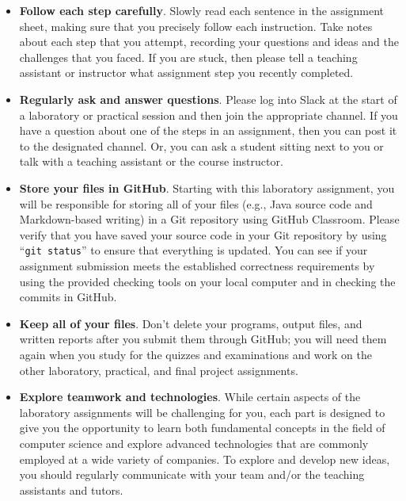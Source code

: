 \documentclass[11pt]{article}
\newcommand{\command}[1]{``\lstinline{#1}''}
\begin{document}
\begin{itemize}
  \setlength{\itemsep}{0pt}

\item {\bf Follow each step carefully}. Slowly read each sentence in the
  assignment sheet, making sure that you precisely follow each instruction. Take
  notes about each step that you attempt, recording your questions and ideas and
  the challenges that you faced. If you are stuck, then please tell a teaching
  assistant or instructor what assignment step you recently completed.

\item {\bf Regularly ask and answer questions}. Please log into Slack at the
  start of a laboratory or practical session and then join the appropriate
  channel. If you have a question about one of the steps in an assignment, then
  you can post it to the designated channel. Or, you can ask a student sitting
  next to you or talk with a teaching assistant or the course instructor.

\item {\bf Store your files in GitHub}. Starting with this laboratory
  assignment, you will be responsible for storing all of your files (e.g., Java
  source code and Markdown-based writing) in a Git repository using GitHub
  Classroom. Please verify that you have saved your source code in your Git
  repository by using \command{git status} to ensure that everything is updated.
  You can see if your assignment submission meets the established correctness
  requirements by using the provided checking tools on your local computer and
  in checking the commits in GitHub.

\item {\bf Keep all of your files}. Don't delete your programs, output files,
  and written reports after you submit them through GitHub; you will need them
  again when you study for the quizzes and examinations and work on the other
  laboratory, practical, and final project assignments.

\item {\bf Explore teamwork and technologies}. While certain aspects of the
  laboratory assignments will be challenging for you, each part is designed to
  give you the opportunity to learn both fundamental concepts in the field of
  computer science and explore advanced technologies that are commonly employed
  at a wide variety of companies. To explore and develop new ideas, you should
  regularly communicate with your team and/or the teaching assistants and
  tutors.


\end{itemize}
\end{document}
